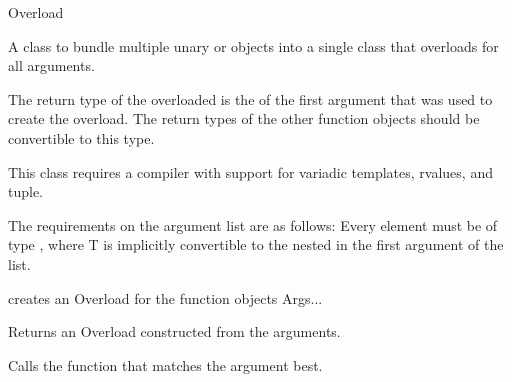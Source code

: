 \begin{ccRefClass}{Overload}


\ccDefinition 

A class to bundle multiple unary  or
 objects into a single class that overloads
 for all arguments.

The return type of the overloaded  is the
 of the first argument that was used to create
the overload. The return types of the other function objects should be
convertible to this type.

This class requires a compiler with support for variadic templates,
rvalues, and tuple.

The requirements on the argument list  are as follows:
Every element must be of type , where T
is implicitly convertible to the nested  in the
first argument of the list.

\ccCreation

              {creates an Overload for the function objects Args...}

           {Returns an Overload constructed from the arguments.}

\ccOperations

         {Calls the function that matches the argument  best.}



\ccSeeAlso
{}


\end{ccRefClass} 
